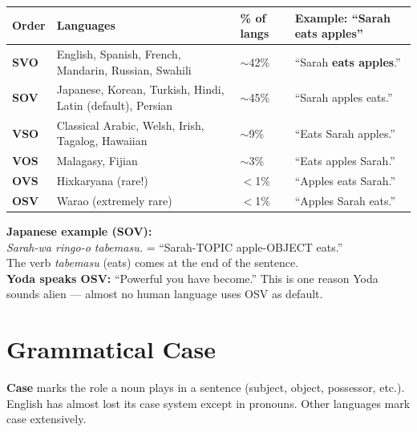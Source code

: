 \documentclass[11pt, letterpaper]{article}
\begin{document}
\noindent
{\small\renewcommand{\arraystretch}{1.6}
\begin{tabularx}{\textwidth}{>{\bfseries\centering\arraybackslash}p{1.5cm}
                              >{\raggedright\arraybackslash}p{4cm}
                              >{\centering\arraybackslash}p{2cm}
                              >{\raggedright\arraybackslash}X}
\toprule
\rowcolor{tableheaderred}
\textbf{Order} & \textbf{Languages} & \textbf{\% of langs} & \textbf{Example: ``Sarah eats apples''} \\
\midrule
\rowcolor{rowRe} SVO  & English, Spanish, French, Mandarin, Russian, Swahili & $\sim$42\% & ``Sarah \textbf{eats apples}.'' \\
\rowcolor{rowA}  SOV  & Japanese, Korean, Turkish, Hindi, Latin (default), Persian & $\sim$45\% & ``Sarah apples eats.'' \\
\rowcolor{rowRe} VSO  & Classical Arabic, Welsh, Irish, Tagalog, Hawaiian & $\sim$9\% & ``Eats Sarah apples.'' \\
\rowcolor{rowA}  VOS  & Malagasy, Fijian       & $\sim$3\% & ``Eats apples Sarah.'' \\
\rowcolor{rowRe} OVS  & Hixkaryana (rare!)     & $<$1\% & ``Apples eats Sarah.'' \\
\rowcolor{rowA}  OSV  & Warao (extremely rare) & $<$1\% & ``Apples Sarah eats.'' \\
\bottomrule
\end{tabularx}}

\textbf{Japanese example (SOV):}\\
\emph{Sarah-wa ringo-o tabemasu.} = ``Sarah-TOPIC apple-OBJECT eats.''\\
The verb \emph{tabemasu} (eats) comes at the end of the sentence.\\[4pt]
\textbf{Yoda speaks OSV:} ``Powerful you have become.'' This is one reason Yoda sounds alien --- almost no human language uses OSV as default.

\section*{Grammatical Case}

\textbf{Case} marks the role a noun plays in a sentence (subject, object, possessor, etc.).
English has almost lost its case system except in pronouns. Other languages mark case extensively.
\end{document}

